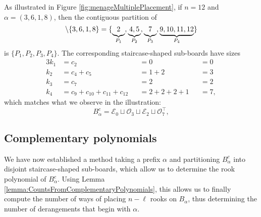 \begin{example}
  As illustrated in Figure \ref{fig:menageMultiplePlacement}, if $n = 12$
  and $\alpha = (3,6,1,8)$, then the contiguous partition of \begin{equation}
    [12] \setminus \{3,6,1,8\} = \{
      \underbrace{2\vphantom{,}}_{P_1},
      \underbrace{4, 5}_{P_2},
      \underbrace{7\vphantom{,}}_{P_3},
      \underbrace{9, 10, 11, 12}_{P_4}
    \}
  \end{equation} is $\{P_1, P_2, P_3, P_4\}$. The corresponding staircase-shaped sub-boards
  have sizes
  \begin{alignat*}{3}
    k_1 &= c_2                            &&= 0             &&= 0 \\
    k_2 &= c_4 + c_5                      &&= 1 + 2         &&= 3 \\
    k_3 &= c_7                            &&= 2             &&= 2 \\
    k_4 &= c_9 + c_{10} + c_{11} + c_{12} &&= 2 + 2 + 2 + 1 &&= 7,
  \end{alignat*}
  which matches what we observe in the illustration:
  \begin{equation}
    B_\alpha^c = \mathcal{E}_0 \sqcup \mathcal{O}_3 \sqcup \mathcal{E}_2 \sqcup \mathcal{O}_7^\intercal,
  \end{equation}
  \label{ex:blocksFromPrefix}
\end{example}

\subsection{Complementary polynomials}
We have now established a method taking a prefix $\alpha$
and partitioning $B_\alpha^c$ into disjoint staircase-shaped sub-boards,
which allow us to determine the rook polynomial of $B_\alpha^c$.
Using Lemma \ref{lemma:CountsFromComplementaryPolynomials}, this allows us
to finally compute the number of ways of placing $n - \ell$ rooks on
$B_\alpha$, thus determining the number of derangements that begin with
$\alpha$.

